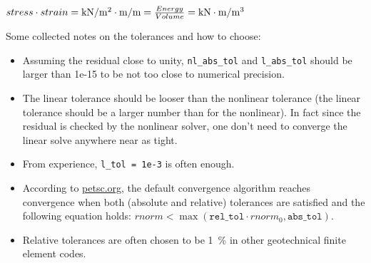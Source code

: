 $ stress \cdot strain = \unit[per-mode = symbol]{\kN\per\square\metre} \cdot \unit[per-mode = symbol]{\metre\per\metre} = \frac{Energy}{Volume} = \unit[per-mode = symbol]{\kilo\newton} \cdot \unit[per-mode = symbol]{\metre\per\cubic\metre} $

Some collected notes on the tolerances and how to choose:

\begin{itemize}
  \item Assuming the residual close to unity, \texttt{nl\_abs\_tol} and
        \texttt{l\_abs\_tol} should be larger than 1e-15 to be not too close to
        numerical precision.
  \item The linear tolerance should be looser than the nonlinear tolerance (the linear
        tolerance should be a larger number than for the nonlinear). In fact since the
        residual is checked by the nonlinear solver, one don't need to converge the
        linear solve anywhere near as tight.
  \item From experience, \texttt{l\_tol = 1e-3} is often enough.
  \item According to
        \href{https://petsc.org/release/manualpages/KSP/KSPConvergedDefault/}{petsc.org},
        the default convergence algorithm reaches convergence when both (absolute and
        relative) tolerances are satisfied and the following equation holds: \newline
        $rnorm < \max (\texttt{rel\_tol} \cdot rnorm_0, \texttt{abs\_tol})$.
  \item Relative tolerances are often chosen to be \SI{1}{\percent} in other
        geotechnical finite element codes.
\end{itemize}






%
